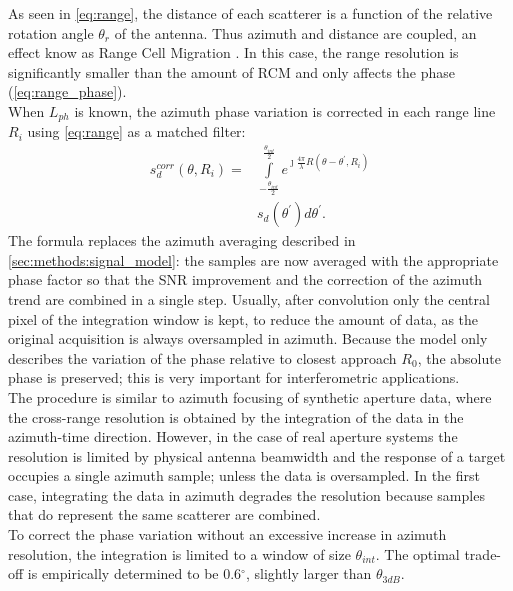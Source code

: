 As seen in \eqref{eq:range}, the distance of each scatterer is a function of the relative rotation angle $\theta_r$ of the antenna. Thus azimuth and distance are coupled, an effect know as Range Cell Migration . In this case, the range resolution is significantly smaller than the amount of RCM and only affects the phase (\eqref{eq:range_phase}).\\
When $L_{ph}$ is known, the azimuth phase variation is corrected in each range line $R_{i}$ using \eqref{eq:range} as a matched filter:
\begin{equation}\label{eq:correction}
	\begin{aligned}
		s_{d}^{corr}\left(\theta, R_{i}\right) = &\int\limits_{-\frac{\theta_{int}}{2}}^{\frac{\theta_{int}}{2}}e^{\jmath \frac{4\pi}{\lambda}R\left(\theta - \theta^{\prime}, R_{i}\right)}\\
		&s_{d}\left(\theta^\prime\right) d\theta^\prime.
	\end{aligned}
\end{equation}
The formula replaces the azimuth averaging described in \autoref{sec:methods:signal_model}: the samples are now averaged with the appropriate phase factor so that the SNR improvement and the correction of the azimuth trend are combined in a single step. Usually, after convolution only the central pixel of the integration window is kept, to reduce the amount of data, as the original acquisition is always oversampled in azimuth. Because the model only describes the variation of the phase relative to closest approach $R_{0}$, the absolute phase is preserved; this is very important for interferometric applications.\\
The procedure is similar to azimuth focusing of synthetic aperture data, where the cross-range resolution is obtained by the integration of the data in the azimuth-time direction. However, in the case of real aperture systems the resolution is limited by physical antenna beamwidth and the response of a target  occupies a single azimuth sample; unless the data is oversampled. In the first case, integrating the data in azimuth degrades the resolution because samples that do represent the same scatterer are combined.\\ To correct the phase variation without an excessive increase in azimuth resolution, the integration is limited to a window of size $\theta_{int}$. The optimal trade-off is empirically determined to be 0.6$^\circ$, slightly larger than $\theta_{3dB}$.
